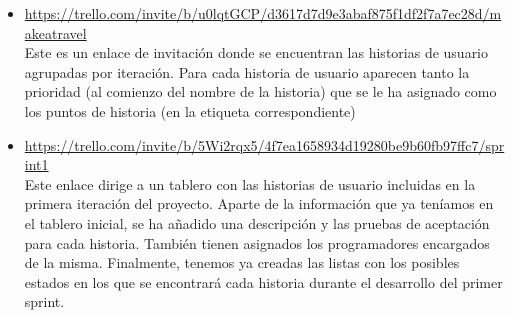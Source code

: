 \documentclass[11pt]{article}
\begin{document}
\begin{itemize}
\item \url{https://trello.com/invite/b/u0lqtGCP/d3617d7d9e3abaf875f1df2f7a7ec28d/makeatravel} \\

Este es un enlace de invitación donde se encuentran las historias de usuario agrupadas por iteración. Para cada historia de usuario aparecen tanto la prioridad (al comienzo del nombre de la historia) que se le ha asignado como los puntos de historia (en la etiqueta correspondiente)

\item \url{https://trello.com/invite/b/5Wi2rqx5/4f7ea1658934d19280be9b60fb97ffc7/sprint1} \\

Este enlace dirige a un tablero con las historias de usuario incluidas en la primera iteración del proyecto. Aparte de la información que ya teníamos en el tablero inicial, se ha  añadido una descripción y las pruebas de aceptación para cada historia. También tienen asignados los programadores encargados de la misma. Finalmente, tenemos ya creadas las listas con los posibles estados en los que se encontrará cada historia durante el desarrollo del primer sprint. 
\end{itemize}
\end{document}
